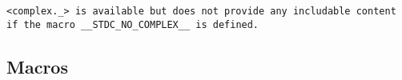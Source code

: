 \def\Subsection#1{\subsection{#1}}

\tt{<complex._>} is available but does not provide any
includable content if the macro \tt{__STDC_NO_COMPLEX__} is defined.

\Subsection{Macros}
